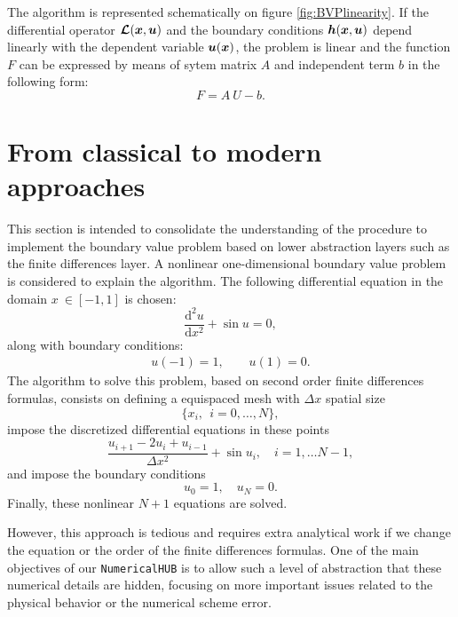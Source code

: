  
       
The algorithm  is represented schematically on figure \ref{fig:BVPlinearity}.
If the differential operator $\boldsymbol{\cal L}( \boldsymbol{x}, \boldsymbol{u})$ and the boundary conditions $\boldsymbol{h}( \boldsymbol{x}, \boldsymbol{u})$ depend linearly with the dependent variable  $\boldsymbol{u}(\boldsymbol{x})$, the problem is linear and the function $ F $ can be expressed by means of sytem matrix $ A $ and independent term $ b $ in the following form: 
 $$
      F = A \ U - b. 
 $$       
 
 \vspace{2cm} 
 \BVPlinearity
        
  


\newpage         
\section{From classical to modern approaches}
This section is intended to consolidate the understanding of the procedure to implement the boundary value problem based on lower abstraction layers such as the finite differences layer. 
A nonlinear one-dimensional  boundary value problem is considered to explain the algorithm.  The following differential equation in the domain \ensuremath{x \ \in [-1,1]} is chosen:
          \begin{equation*}
          \frac{\text{d}^2u}{\text{d}x^2} + \sin u = 0,
          \end{equation*}
          along with boundary conditions:
          \begin{align*}
          u(-1) = 1, \qquad u(1)= 0.
          \end{align*}
The algorithm to solve this problem, based on second order finite differences formulas, consists on defining a equispaced mesh with $ \Delta x $ spatial size 
          $$
           \{ x_i, \ \ i=0, \ldots, N \}, 
           $$ 
          impose the discretized differential equations in these points
          $$
              \frac{ u_{i+1} - 2 u_i + u_{i-1} }{ \Delta x^2 } + \sin u_i, \quad i=1, \ldots N-1,
          $$
          and impose the boundary conditions
          $$
              u_0 = 1, \quad u_N = 0. 
          $$
Finally, these  nonlinear  $ N+1$ equations are solved. 

However, this approach is tedious and requires extra analytical work if we change the equation or the order of the finite differences formulas. 
One of the main objectives of our \verb|NumericalHUB| is to allow such a level of abstraction that these numerical details are hidden, focusing on more important issues related to the physical behavior or the numerical scheme error. 


